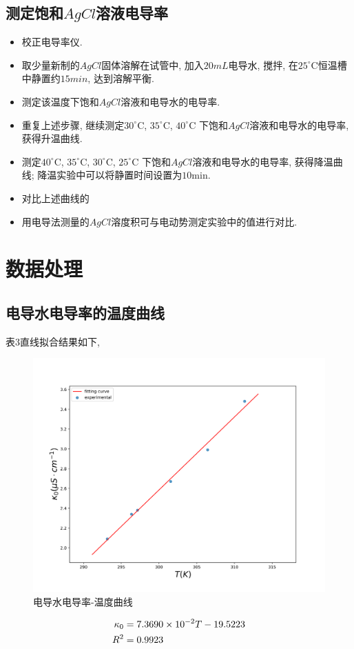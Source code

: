 \documentclass[a4paper]{article}
\begin{document}
\subsection{测定饱和$AgCl$溶液电导率}
\begin{itemize}
	\item 校正电导率仪.
	\item 取少量新制的$AgCl$固体溶解在试管中, 加入$20mL$电导水, 
	搅拌, 在$25^\circ$C恒温槽中静置约$15min$, 达到溶解平衡.
	\item 测定该温度下饱和$AgCl$溶液和电导水的电导率. 
	\item 重复上述步骤, 继续测定$30^\circ$C, $35^\circ$C, $40^\circ$C
	下饱和$AgCl$溶液和电导水的电导率, 获得升温曲线.
	\item 测定$40^\circ$C, $35^\circ$C, $30^\circ$C, $25^\circ$C
	下饱和$AgCl$溶液和电导水的电导率, 获得降温曲线; 
	降温实验中可以将静置时间设置为$10$min.
	\item 对比上述曲线的
	\item 用电导法测量的$AgCl$溶度积可与电动势测定实验中的值进行对比.
\end{itemize}
\newpage
\section{数据处理}
\subsection{电导水电导率的温度曲线}
表3直线拟合结果如下,
\begin{figure}[H]
	\centering
	\includegraphics[width = 0.5\linewidth]{fig/H2O.png}
	\caption{电导水电导率-温度曲线}
	\label{}
\end{figure}
\begin{equation}
	\centering
	\begin{aligned}
		\kappa_{0} &= 7.3690\times 10^{-2} T - 19.5223\\
		R^{2} &= 0.9923\\
	\end{aligned}
\end{equation}
\end{document}
